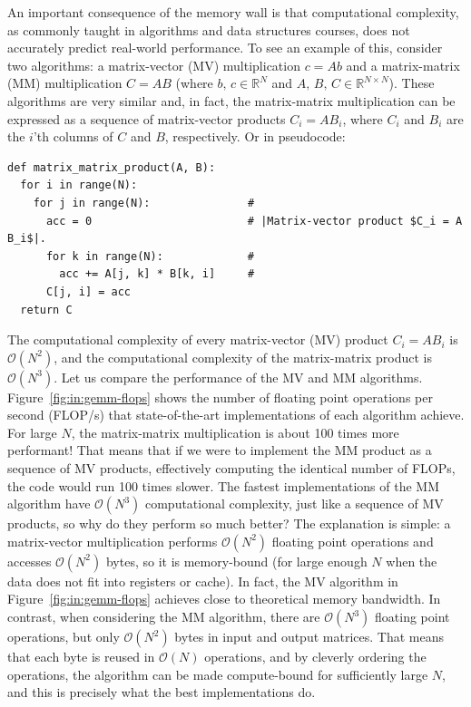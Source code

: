An important consequence of the memory wall is that computational complexity, as commonly taught in algorithms and data structures courses, does not accurately predict real-world performance. To see an example of this, consider two algorithms: a matrix-vector (MV) multiplication $c = A b$ and a matrix-matrix (MM) multiplication $C = A B$ (where $b,\,c\in \mathbb{R}^N$ and $A,\,B,\,C\in \mathbb{R}^{N\times N}$). These algorithms are very similar and, in fact, the matrix-matrix multiplication can be expressed as a sequence of matrix-vector products $C_i = A B_i$, where $C_i$ and $B_i$ are the $i$'th columns of $C$ and $B$, respectively. Or in pseudocode:
\vspace{-0.1cm}
\begin{verbatim}
def matrix_matrix_product(A, B):
  for i in range(N):
    for j in range(N):               #
      acc = 0                        # |Matrix-vector product $C_i = A B_i$|.
      for k in range(N):             # 
        acc += A[j, k] * B[k, i]     #
      C[j, i] = acc
  return C
\end{verbatim}
\vspace{-0.1cm}
The computational complexity of every matrix-vector (MV) product $C_i = A B_i$ is $\mathcal{O}(N^2)$, and the computational complexity of the matrix-matrix product is $\mathcal{O}(N^3)$. Let us compare the performance of the MV and MM algorithms. Figure~\ref{fig:in:gemm-flops} shows the number of floating point operations per second (FLOP/s) that state-of-the-art implementations of each algorithm achieve. For large $N$, the matrix-matrix multiplication is about 100 times more performant! That means that if we were to implement the MM product as a sequence of MV products, effectively computing the identical number of FLOPs, the code would run 100 times slower. The fastest implementations of the MM algorithm have $\mathcal{O}(N^3)$ computational complexity, just like a sequence of MV products, so why do they perform so much better? The explanation is simple: a matrix-vector multiplication performs $\mathcal{O}(N^2)$ floating point operations and accesses $\mathcal{O}(N^2)$ bytes, so it is memory-bound (for large enough $N$ when the data does not fit into registers or cache). In fact, the MV algorithm in Figure~\ref{fig:in:gemm-flops} achieves close to theoretical memory bandwidth. In contrast, when considering the MM algorithm, there are $\mathcal{O}(N^3)$ floating point operations, but only $\mathcal{O}(N^2)$ bytes in input and output matrices. That means that each byte is reused in $\mathcal{O}(N)$ operations, and by cleverly ordering the operations, the algorithm can be made compute-bound for sufficiently large $N$, and this is precisely what the best implementations do.


